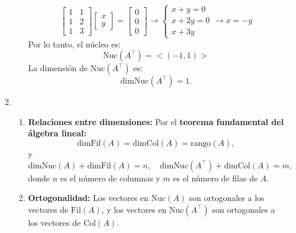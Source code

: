 \begin{enumerate}[label=\color{red}\textbf{\arabic*)}]
\begin{enumerate}[label=\color{red}\textbf{\alph*)}]
\begin{enumerate}[label=\arabic*)]
\[        \begin{bmatrix} 
            1 & 1\\
            1 & 2\\
            1 & 3
        \end{bmatrix} \begin{bmatrix} 
        x\\y 
        \end{bmatrix} =\begin{bmatrix} 
        0\\0\\0 
        \end{bmatrix} \longrightarrow \begin{cases}
            x+y=0\\
            x+2y=0\\
            x+3y
        \end{cases}\longrightarrow x=-y
        \] 
        Por lo tanto, el núcleo es: \[
        \mathrm{Nuc}(A^\intercal)=<(-1,1)>
        \] 
        La dimensión de $\mathrm{Nuc}(A^\intercal)$ es: \[
        \mathrm{dimNuc}(A^\intercal)=1.
        \] 
        \end{enumerate}
    \item {} 
        \begin{enumerate}[label=\arabic*)]
            \item \textbf{Relaciones entre dimensiones:} Por el \textbf{teorema fundamental del álgebra lineal:} \[
            \mathrm{dimFil}(A)=\mathrm{dimCol}(A)=\mathrm{rango}(A),
            \] y \[
            \mathrm{dimNuc}(A)+\mathrm{dimFil}(A)=n, \quad \mathrm{dimNuc}(A^\intercal)+\mathrm{dimCol}(A)=m,
            \]   donde $n$ es el número de columnas y  $m$ es el número de filas de $A$.
        \item \textbf{Ortogonalidad:} Los vectores en $\mathrm{Nuc}(A)$ son ortogonales a los vectores de $\mathrm{Fil}(A)$, y los vectores en $\mathrm{Nuc}(A^\intercal)$ son ortogonales a los vectores de $\mathrm{Col}(A)$.
        \end{enumerate}
\end{enumerate}
\end{enumerate}

